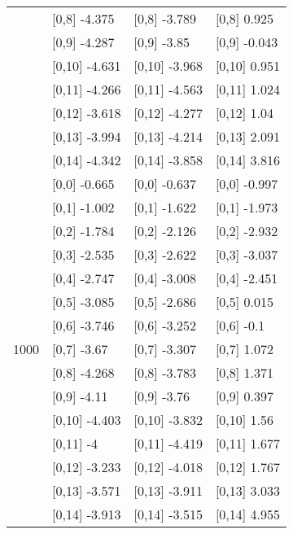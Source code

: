 \begin{table}
\begin{tabular}[t]{llll}
 & {}[0,8] -4.375 & {}[0,8] -3.789 & {}[0,8] 0.925\\
 & {}[0,9] -4.287 & {}[0,9] -3.85 & {}[0,9] -0.043\\
\addlinespace
 & {}[0,10] -4.631 & {}[0,10] -3.968 & {}[0,10] 0.951\\
 & {}[0,11] -4.266 & {}[0,11] -4.563 & {}[0,11] 1.024\\
 & {}[0,12] -3.618 & {}[0,12] -4.277 & {}[0,12] 1.04\\
 & {}[0,13] -3.994 & {}[0,13] -4.214 & {}[0,13] 2.091\\
 & {}[0,14] -4.342 & {}[0,14] -3.858 & {}[0,14] 3.816\\
\addlinespace
 & {}[0,0] -0.665 & {}[0,0] -0.637 & {}[0,0] -0.997\\
 & {}[0,1] -1.002 & {}[0,1] -1.622 & {}[0,1] -1.973\\
 & {}[0,2] -1.784 & {}[0,2] -2.126 & {}[0,2] -2.932\\
 & {}[0,3] -2.535 & {}[0,3] -2.622 & {}[0,3] -3.037\\
 & {}[0,4] -2.747 & {}[0,4] -3.008 & {}[0,4] -2.451\\
\addlinespace
 & {}[0,5] -3.085 & {}[0,5] -2.686 & {}[0,5] 0.015\\
 & {}[0,6] -3.746 & {}[0,6] -3.252 & {}[0,6] -0.1\\
1000 & {}[0,7] -3.67 & {}[0,7] -3.307 & {}[0,7] 1.072\\
 & {}[0,8] -4.268 & {}[0,8] -3.783 & {}[0,8] 1.371\\
 & {}[0,9] -4.11 & {}[0,9] -3.76 & {}[0,9] 0.397\\
\addlinespace
 & {}[0,10] -4.403 & {}[0,10] -3.832 & {}[0,10] 1.56\\
 & {}[0,11] -4 & {}[0,11] -4.419 & {}[0,11] 1.677\\
 & {}[0,12] -3.233 & {}[0,12] -4.018 & {}[0,12] 1.767\\
 & {}[0,13] -3.571 & {}[0,13] -3.911 & {}[0,13] 3.033\\
 & {}[0,14] -3.913 & {}[0,14] -3.515 & {}[0,14] 4.955\\
\bottomrule
\end{tabular}
\end{table}
